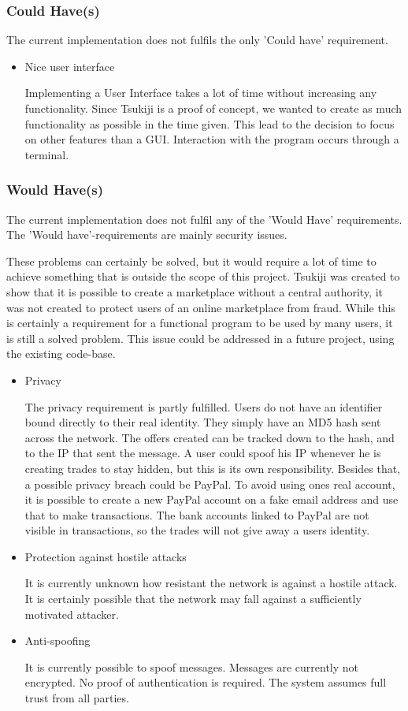\subsubsection{Could Have(s)}
The current implementation does not fulfils the only 'Could have' requirement.

\begin{itemize}
\item Nice user interface

Implementing a User Interface takes a lot of time without increasing any functionality.
Since Tsukiji is a proof of concept, we wanted to create as much functionality as possible in the time given.
This lead to the decision to focus on other features than a GUI.
Interaction with the program occurs through a terminal.
\end{itemize}

\subsubsection{Would Have(s)}
The current implementation does not fulfil any of the 'Would Have' requirements.
The 'Would have'-requirements are mainly security issues.

These problems can certainly be solved, but it would require a lot of time to achieve something that is outside the scope of this project.
Tsukiji was created to show that it is possible to create a marketplace without a central authority, it was not created to protect users of an online marketplace from fraud.
While this is certainly a requirement for a functional program to be used by many users, it is still a solved problem.
This issue could be addressed in a future project, using the existing code-base.

\begin{itemize}
\item Privacy

The privacy requirement is partly fulfilled.
Users do not have an identifier bound directly to their real identity.
They simply have an MD5 hash sent across the network.
The offers created can be tracked down to the hash, and to the IP that sent the message.
A user could spoof his IP whenever he is creating trades to stay hidden, but this is its own responsibility.
Besides that, a possible privacy breach could be PayPal.
To avoid using ones real account, it is possible to create a new PayPal account on a fake email address and use that to make transactions.
The bank accounts linked to PayPal are not visible in transactions, so the trades will not give away a users identity.

\item Protection against hostile attacks

It is currently unknown how resistant the network is against a hostile attack.
It is certainly possible that the network may fall against a sufficiently motivated attacker.

\item Anti-spoofing

It is currently possible to spoof messages.
Messages are currently not encrypted.
No proof of authentication is required.
The system assumes full trust from all parties.
\end{itemize}

